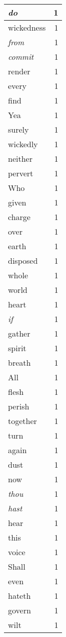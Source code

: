 \begin{center}
\begin{longtable}{l|r}
\emph{do} & 1 \\ \hline
wickedness & 1 \\ \hline
\emph{from} & 1 \\ \hline
\emph{commit} & 1 \\ \hline
render & 1 \\ \hline
every & 1 \\ \hline
find & 1 \\ \hline
Yea & 1 \\ \hline
surely & 1 \\ \hline
wickedly & 1 \\ \hline
neither & 1 \\ \hline
pervert & 1 \\ \hline
Who & 1 \\ \hline
given & 1 \\ \hline
charge & 1 \\ \hline
over & 1 \\ \hline
earth & 1 \\ \hline
disposed & 1 \\ \hline
whole & 1 \\ \hline
world & 1 \\ \hline
heart & 1 \\ \hline
\emph{if} & 1 \\ \hline
gather & 1 \\ \hline
spirit & 1 \\ \hline
breath & 1 \\ \hline
All & 1 \\ \hline
flesh & 1 \\ \hline
perish & 1 \\ \hline
together & 1 \\ \hline
turn & 1 \\ \hline
again & 1 \\ \hline
dust & 1 \\ \hline
now & 1 \\ \hline
\emph{thou} & 1 \\ \hline
\emph{hast} & 1 \\ \hline
hear & 1 \\ \hline
this & 1 \\ \hline
voice & 1 \\ \hline
Shall & 1 \\ \hline
even & 1 \\ \hline
hateth & 1 \\ \hline
govern & 1 \\ \hline
wilt & 1 \\ \hline

\end{longtable}
\end{center}
